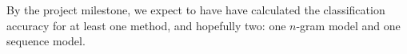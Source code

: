 \documentclass[10pt,letterpaper]{article}
\numberwithin{equation}{section}
\numberwithin{figure}{section}
\begin{document}
By the project milestone, we expect to have have calculated the classification accuracy for at least one method, and hopefully two: one $n$-gram model and one sequence model.



\nocite{*}




\end{document}
